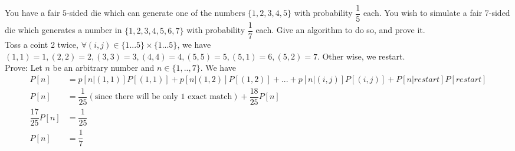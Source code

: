 \documentclass{article}
\begin{document}
\clearpage
\begin{addmargin}[2em]{2em}
You have a fair $5$-sided die which can generate one of the numbers $\{1, 2, 3, 4, 5\}$ with probability
$\dfrac{1}{5}$ each. You wish to simulate a fair $7$-sided die which generates a number in $\{1, 2, 3, 4, 5, 6, 7\}$ with probability $\dfrac{1}{7}$
each. Give an algorithm to do so, and prove it.\\

Toss a coint 2 twice, $\forall (i,j) \in \{1...5\}\times\{1...5\}$, we have $(1,1)=1,(2,2)=2,(3,3)=3,(4,4)=4,(5,5)=5,(5,1)=6,(5,2)=7$. Other wise, we restart.\\

Prove: Let $n$ be an arbitrary number and $n \in \{1,..,7\}$. We have 
\begin{align*}
	P[n]&=p[n|(1,1)]P[(1,1)]+p[n|(1,2)]P[(1,2)]+...+p[n|(i,j)]P[(i,j)]+P[n|restart]P[restart]\\
	P[n]&=\dfrac{1}{25}(\text{since there will be only 1 exact match}) + \dfrac{18}{25}P[n]\\
	\dfrac{17}{25}P[n]&=\dfrac{1}{25}\\
	P[n] &= \dfrac{1}{7}\\
\end{align*}
\end{addmargin}

\clearpage
\end{document}
